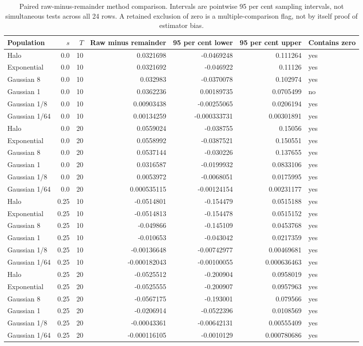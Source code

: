 \documentclass[fleqn,usenatbib]{mnras}
\begin{document}
\begin{table}
\centering
\caption{Paired raw-minus-remainder method comparison. Intervals are pointwise 95 per cent sampling intervals, not simultaneous tests across all 24 rows. A retained exclusion of zero is a multiple-comparison flag, not by itself proof of estimator bias.}\label{tab-consistency}
\small
\setlength{\tabcolsep}{4pt}
\begin{tabular}{lrrrrrl}
\toprule
Population & $s$ & $T$ & Raw minus remainder & 95 per cent lower & 95 per cent upper & Contains zero \\
\midrule
Halo & 0.0 & 10 & 0.0321698 & -0.0469248 & 0.111264 & yes \\
Exponential & 0.0 & 10 & 0.0321692 & -0.046922 & 0.11126 & yes \\
Gaussian 8 & 0.0 & 10 & 0.032983 & -0.0370078 & 0.102974 & yes \\
Gaussian 1 & 0.0 & 10 & 0.0362236 & 0.00189735 & 0.0705499 & no \\
Gaussian 1/8 & 0.0 & 10 & 0.00903438 & -0.00255065 & 0.0206194 & yes \\
Gaussian 1/64 & 0.0 & 10 & 0.00134259 & -0.000333731 & 0.00301891 & yes \\
Halo & 0.0 & 20 & 0.0559024 & -0.038755 & 0.15056 & yes \\
Exponential & 0.0 & 20 & 0.0558992 & -0.0387521 & 0.150551 & yes \\
Gaussian 8 & 0.0 & 20 & 0.0537144 & -0.030226 & 0.137655 & yes \\
Gaussian 1 & 0.0 & 20 & 0.0316587 & -0.0199932 & 0.0833106 & yes \\
Gaussian 1/8 & 0.0 & 20 & 0.0053972 & -0.0068051 & 0.0175995 & yes \\
Gaussian 1/64 & 0.0 & 20 & 0.000535115 & -0.00124154 & 0.00231177 & yes \\
Halo & 0.25 & 10 & -0.0514801 & -0.154479 & 0.0515188 & yes \\
Exponential & 0.25 & 10 & -0.0514813 & -0.154478 & 0.0515152 & yes \\
Gaussian 8 & 0.25 & 10 & -0.049866 & -0.145109 & 0.0453768 & yes \\
Gaussian 1 & 0.25 & 10 & -0.010653 & -0.043042 & 0.0217359 & yes \\
Gaussian 1/8 & 0.25 & 10 & -0.00136648 & -0.00742977 & 0.00469681 & yes \\
Gaussian 1/64 & 0.25 & 10 & -0.000182043 & -0.00100055 & 0.000636463 & yes \\
Halo & 0.25 & 20 & -0.0525512 & -0.200904 & 0.0958019 & yes \\
Exponential & 0.25 & 20 & -0.0525555 & -0.200907 & 0.0957963 & yes \\
Gaussian 8 & 0.25 & 20 & -0.0567175 & -0.193001 & 0.079566 & yes \\
Gaussian 1 & 0.25 & 20 & -0.0206914 & -0.0522396 & 0.0108569 & yes \\
Gaussian 1/8 & 0.25 & 20 & -0.00043361 & -0.00642131 & 0.00555409 & yes \\
Gaussian 1/64 & 0.25 & 20 & -0.000116105 & -0.0010129 & 0.000780686 & yes \\
\bottomrule
\end{tabular}
\end{table}

\clearpage
\end{document}
